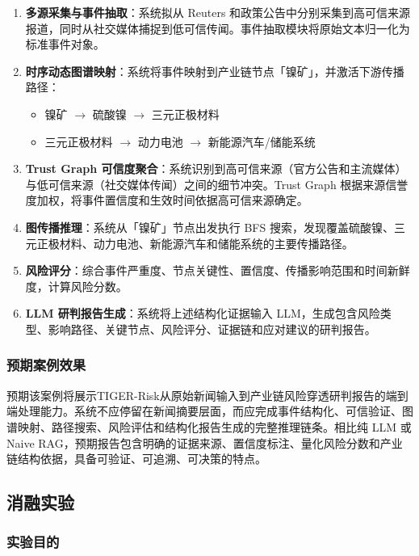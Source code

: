 \documentclass[12pt,a4paper]{article}
\newcommand{\projectshort}{TIGER-Risk}
\newcommand{\term}[1]{\textbf{#1}}
\begin{document}
\begin{enumerate}
    \item \term{多源采集与事件抽取}：系统拟从 Reuters 和政策公告中分别采集到高可信来源报道，同时从社交媒体捕捉到低可信传闻。事件抽取模块将原始文本归一化为标准事件对象。
    \item \term{时序动态图谱映射}：系统将事件映射到产业链节点「镍矿」，并激活下游传播路径：
    \begin{itemize}
        \item 镍矿 $\to$ 硫酸镍 $\to$ 三元正极材料
        \item 三元正极材料 $\to$ 动力电池 $\to$ 新能源汽车/储能系统
    \end{itemize}
    \item \term{Trust Graph 可信度聚合}：系统识别到高可信来源（官方公告和主流媒体）与低可信来源（社交媒体传闻）之间的细节冲突。Trust Graph 根据来源信誉度加权，将事件置信度和生效时间依据高可信来源确定。
    \item \term{图传播推理}：系统从「镍矿」节点出发执行 BFS 搜索，发现覆盖硫酸镍、三元正极材料、动力电池、新能源汽车和储能系统的主要传播路径。
    \item \term{风险评分}：综合事件严重度、节点关键性、置信度、传播影响范围和时间新鲜度，计算风险分数。
    \item \term{LLM 研判报告生成}：系统将上述结构化证据输入 LLM，生成包含风险类型、影响路径、关键节点、风险评分、证据链和应对建议的研判报告。
\end{enumerate}

\subsubsection{预期案例效果}

预期该案例将展示\projectshort 从原始新闻输入到产业链风险穿透研判报告的端到端处理能力。系统不应停留在新闻摘要层面，而应完成事件结构化、可信验证、图谱映射、路径搜索、风险评估和结构化报告生成的完整推理链条。相比纯 LLM 或 Naive RAG，预期报告包含明确的证据来源、置信度标注、量化风险分数和产业链结构依据，具备可验证、可追溯、可决策的特点。

\subsection{消融实验}
\label{sec:exp-ablation}

\subsubsection{实验目的}
\end{document}
